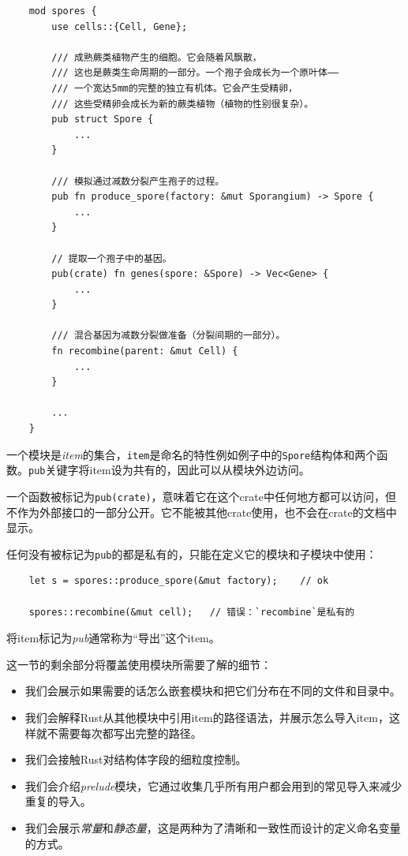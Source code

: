 \begin{verbatim}
    mod spores {
        use cells::{Cell, Gene};

        /// 成熟蕨类植物产生的细胞。它会随着风飘散，
        /// 这也是蕨类生命周期的一部分。一个孢子会成长为一个原叶体——
        /// 一个宽达5mm的完整的独立有机体。它会产生受精卵，
        /// 这些受精卵会成长为新的蕨类植物（植物的性别很复杂）。
        pub struct Spore {
            ...
        }

        /// 模拟通过减数分裂产生孢子的过程。
        pub fn produce_spore(factory: &mut Sporangium) -> Spore {
            ...
        }

        // 提取一个孢子中的基因。
        pub(crate) fn genes(spore: &Spore) -> Vec<Gene> {
            ...
        }

        /// 混合基因为减数分裂做准备（分裂间期的一部分）。
        fn recombine(parent: &mut Cell) {
            ...
        }

        ...
    }
\end{verbatim}

一个模块是\emph{item}的集合，\texttt{item}是命名的特性例如例子中的\texttt{Spore}结构体和两个函数。\texttt{pub}关键字将item设为共有的，因此可以从模块外边访问。

一个函数被标记为\texttt{pub(crate)}，意味着它在这个crate中任何地方都可以访问，但不作为外部接口的一部分公开。它不能被其他crate使用，也不会在crate的文档中显示。

任何没有被标记为\texttt{pub}的都是私有的，只能在定义它的模块和子模块中使用：
\begin{verbatim}
    let s = spores::produce_spore(&mut factory);    // ok
    
    spores::recombine(&mut cell);   // 错误：`recombine`是私有的
\end{verbatim}

将item标记为\emph{pub}通常称为“导出”这个item。

这一节的剩余部分将覆盖使用模块所需要了解的细节：
\begin{itemize}
    \item 我们会展示如果需要的话怎么嵌套模块和把它们分布在不同的文件和目录中。
    \item 我们会解释Rust从其他模块中引用item的路径语法，并展示怎么导入item，这样就不需要每次都写出完整的路径。
    \item 我们会接触Rust对结构体字段的细粒度控制。
    \item 我们会介绍\emph{prelude}模块，它通过收集几乎所有用户都会用到的常见导入来减少重复的导入。
    \item 我们会展示\emph{常量}和\emph{静态量}，这是两种为了清晰和一致性而设计的定义命名变量的方式。
\end{itemize}

